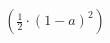 \documentclass[preview]{standalone}
\begin{document}
\begin{align*}
(\frac{1}{2} \cdot (1-a)^2)
\end{align*}
\end{document}
